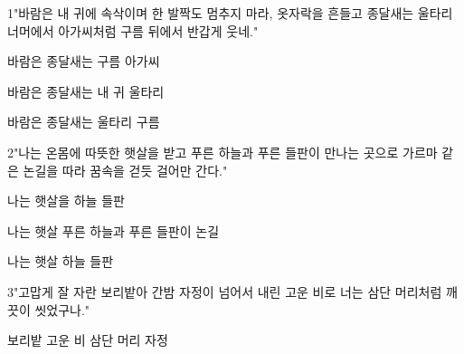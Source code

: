 \documentclass[fs85,seriesRus]{korfarm-base}
\begin{document}
\kfActivityBg \par{}
\par{}\par\nopagebreak[4]\smallskip\nopagebreak[4]
\kfBeginMC
\begin{kfSentenceUnit}{1}{"바람은 내 귀에 속삭이며 한 발짝도 멈추지 마라, 옷자락을 흔들고 종달새는 울타리 너머에서 아가씨처럼 구름 뒤에서 반갑게 웃네."}
\begin{kfChoices}
\kfChoice 바람은
\kfChoice 종달새는
\kfChoice 구름
\kfChoice 아가씨
\end{kfChoices}
\begin{kfChoices}
\kfChoice 바람은
\kfChoice 종달새는
\kfChoice 내 귀
\kfChoice 울타리
\end{kfChoices}
\begin{kfChoices}
\kfChoice 바람은
\kfChoice 종달새는
\kfChoice 울타리
\kfChoice 구름
\end{kfChoices}
\end{kfSentenceUnit}

\begin{kfSentenceUnit}{2}{"나는 온몸에 따뜻한 햇살을 받고 푸른 하늘과 푸른 들판이 만나는 곳으로 가르마 같은 논길을 따라 꿈속을 걷듯 걸어만 간다."}
\begin{kfChoices}
\kfChoice 나는
\kfChoice 햇살을
\kfChoice 하늘
\kfChoice 들판
\end{kfChoices}
\begin{kfChoices}
\kfChoice 나는
\kfChoice 햇살
\kfChoice 푸른 하늘과 푸른 들판이
\kfChoice 논길
\end{kfChoices}
\begin{kfChoices}
\kfChoice 나는
\kfChoice 햇살
\kfChoice 하늘
\kfChoice 들판
\end{kfChoices}
\end{kfSentenceUnit}

\begin{kfSentenceUnit}{3}{"고맙게 잘 자란 보리밭아 간밤 자정이 넘어서 내린 고운 비로 너는 삼단 머리처럼 깨끗이 씻었구나."}
\begin{kfChoices}
\kfChoice 보리밭
\kfChoice 고운 비
\kfChoice 삼단 머리
\kfChoice 자정
\end{kfChoices}
\end{kfSentenceUnit}
\end{document}
